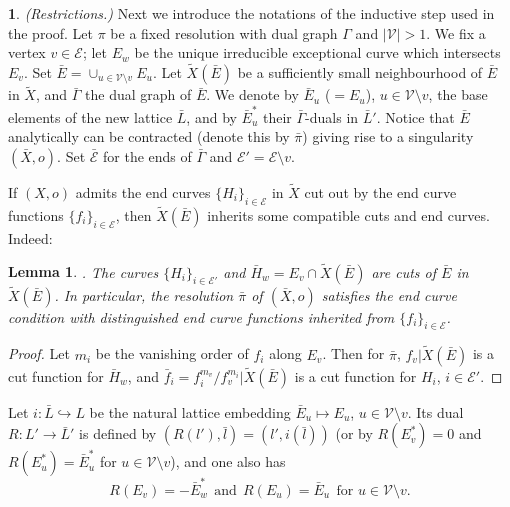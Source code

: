 \documentclass[10pt,a4paper]{amsart}
\numberwithin{equation}{section}
\numberwithin{equation}{subsection}
\theoremstyle{plain}
\newtheorem{lemma}[equation]{Lemma}
\theoremstyle{definition}
\newtheorem{bekezd}[equation]{}
\begin{document}
\begin{bekezd}\label{ss:res}{\em (Restrictions.)} Next we introduce the notations
of the  inductive step used in the proof. Let $\pi$ be a fixed
resolution with dual graph $\Gamma$ and $|{\mathcal{V}}|>1$.  We fix a
vertex $v\in{\mathcal{E}}$; let $E_w$ be the unique irreducible exceptional
curve which intersects $E_v$. Set $\bar{E}=\cup _{u\in{\mathcal{V}}\setminus
v}E_u$.  Let ${\widetilde{X}(\bar{E})}$ be a sufficiently small neighbourhood of
$\bar{E}$ in $\widetilde{X}$, and $\bar{\Gamma}$ the  dual graph
of $\bar{E}$. We denote by $\bar{E}_u$ ($=E_u$), $u\in{\mathcal{V}}\setminus
v$,  the base elements of the new lattice $\bar{L}$, and by
$\bar{E}^*_u$ their $\bar{\Gamma}$-duals in $\bar{L}'$. Notice
that $\bar{E}$ analytically can be contracted (denote this by
$\bar{\pi}$) giving rise to a singularity $(\bar{X},o)$. Set
$\bar{\mathcal{E}}$ for the ends of $\bar{\Gamma}$ and ${\mathcal{E}}'={\mathcal{E}}\setminus
v$.

If $(X,o)$ admits the end curves $\{H_i\}_{i\in{\mathcal{E}}}$ in
$\widetilde{X}$ cut out by the end curve functions
$\{f_i\}_{i\in{\mathcal{E}}}$,  then   ${\widetilde{X}(\bar{E})}$ inherits some compatible cuts
and end curves. Indeed:
\end{bekezd}
\begin{lemma}\label{lem:31} \cite[(2.15)]{Opg}.
The curves $\{H_i\}_{i\in {\mathcal{E}}'}$ and $\bar{H}_w=E_v\cap {\widetilde{X}(\bar{E})}$ are
cuts of $\bar{E}$ in ${\widetilde{X}(\bar{E})}$. In particular, the resolution
$\bar{\pi}$ of $(\bar{X},o)$ satisfies the end curve condition
with distinguished end curve functions inherited from
$\{f_i\}_{i\in{\mathcal{E}}}$.
\end{lemma}

\begin{proof}
Let $m_i$ be the vanishing order of $f_i$ along $E_v$. Then for
$\bar{\pi}$,  $f_v|{\widetilde{X}(\bar{E})}$ is a cut function for $\bar{H}_w$, and
$\bar{f}_i=f^{m_v}_i/f^{m_i}_v|{\widetilde{X}(\bar{E})}$ is a cut function for $H_i$,
$i\in {\mathcal{E}}'$.
\end{proof}

Let $i:\bar{L}\hookrightarrow L$ be the natural lattice embedding
$\bar{E}_u\mapsto E_u$, $u\in{\mathcal{V}}\setminus v$. Its dual  $R:L'\to
\bar{L}'$ is defined by $(R(l'),\bar{l})=(l',i(\bar{l}))$ (or by
$R(E^*_v)=0$ and $R(E^*_u)=\bar{E}^*_u$ for $u\in {\mathcal{V}}\setminus
v$), and one also has
\begin{equation}\label{eq:3.2}
R(E_v)=-\bar{E}^*_w \ \ \mbox{and} \ \ R(E_u)=\bar{E}_u \ \ \mbox{for $u\in{\mathcal{V}}\setminus v$}.
\end{equation}
\end{document}
